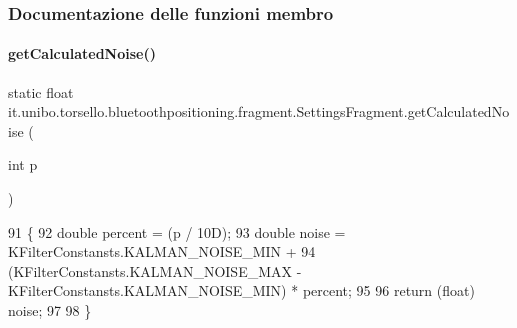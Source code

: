 \subsubsection{Documentazione delle funzioni membro}
\hypertarget{classit_1_1unibo_1_1torsello_1_1bluetoothpositioning_1_1fragment_1_1SettingsFragment_a595d859602f34ca81957a0578c1602a6_a595d859602f34ca81957a0578c1602a6}{}\label{classit_1_1unibo_1_1torsello_1_1bluetoothpositioning_1_1fragment_1_1SettingsFragment_a595d859602f34ca81957a0578c1602a6_a595d859602f34ca81957a0578c1602a6} 
\paragraph{\texorpdfstring{get\+Calculated\+Noise()}{getCalculatedNoise()}}
{\footnotesize\ttfamily static float it.\+unibo.\+torsello.\+bluetoothpositioning.\+fragment.\+Settings\+Fragment.\+get\+Calculated\+Noise (\begin{DoxyParamCaption}\item[{int}]{p }\end{DoxyParamCaption})\hspace{0.3cm}{\ttfamily [static]}}


\begin{DoxyCode}
91                                                   \{
92         \textcolor{keywordtype}{double} percent = (p / 10D);
93         \textcolor{keywordtype}{double} noise = KFilterConstansts.KALMAN\_NOISE\_MIN +
94                 (KFilterConstansts.KALMAN\_NOISE\_MAX - KFilterConstansts.KALMAN\_NOISE\_MIN) * percent;
95 
96         \textcolor{keywordflow}{return} (\textcolor{keywordtype}{float}) noise;
97 
98     \}
\end{DoxyCode}
\hypertarget{classit_1_1unibo_1_1torsello_1_1bluetoothpositioning_1_1fragment_1_1SettingsFragment_a4eb69c78cde2ba119eb62453688280f5_a4eb69c78cde2ba119eb62453688280f5}{}\label{classit_1_1unibo_1_1torsello_1_1bluetoothpositioning_1_1fragment_1_1SettingsFragment_a4eb69c78cde2ba119eb62453688280f5_a4eb69c78cde2ba119eb62453688280f5} 
